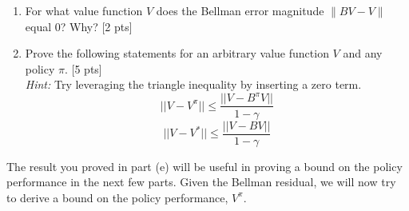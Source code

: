 \documentclass[11pt]{article}
\begin{document}
\begin{enumerate}
    \item[(d)] For what value function $V$ does the Bellman error magnitude $\|BV - V \|$ equal 0? Why? [2 pts]

    \begin{tcolorbox}[breakable]

    \end{tcolorbox}
    \newpage
    \item[(e)] Prove the following statements for an arbitrary value function $V$ and any policy $\pi$.  [5 pts]\\
    \textit{Hint:} Try leveraging the triangle inequality by inserting a zero term.
    \begin{equation}
        ||V - V^\pi|| \leq \frac{||V - B^\pi V||}{1-\gamma}
    \end{equation}
    \begin{equation}
        ||V - V^*|| \leq \frac{||V - BV||}{1-\gamma}
    \end{equation}

    \begin{tcolorbox}[breakable]

    \end{tcolorbox}
    \newpage
\end{enumerate}

\noindent The result you proved in part (e) will be useful in proving a bound on the policy performance in the next few parts. Given the Bellman residual, we will now try to derive a bound on the policy performance, $V^\pi$.
\end{document}
